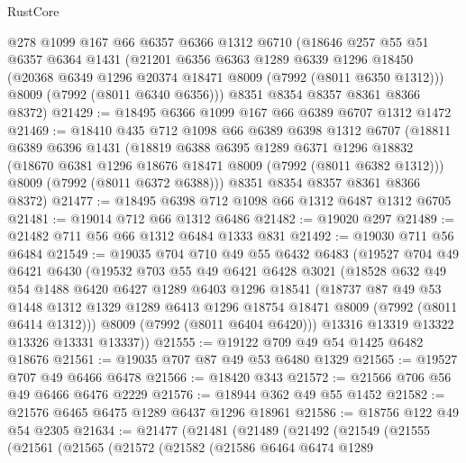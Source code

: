 \begin{lexlean}{RustCore}
\begin{coremodule}
    @278
    @1099
    @167
    @66
    @6357
    @6366
    @1312
    @6710
    (@18646
      @257
      @55
      @51
      @6357
      @6364
      @1431
      (@21201
        @6356
        @6363
        @1289
        @6339
        @1296
        @18450
        (@20368 @6349 @1296 @20374 @18471 @8009 (@7992 (@8011 @6350 @1312)))
        @8009
        (@7992 (@8011 @6340 @6356)))
      @8351
      @8354
      @8357
      @8361
      @8366
      @8372)
@21429 := @18495 @6366 @1099 @167 @66 @6389 @6707 @1312 @1472
@21469 := @18410
    @435
    @712
    @1098
    @66
    @6389
    @6398
    @1312
    @6707
    (@18811
      @6389
      @6396
      @1431
      (@18819
        @6388
        @6395
        @1289
        @6371
        @1296
        @18832
        (@18670 @6381 @1296 @18676 @18471 @8009 (@7992 (@8011 @6382 @1312)))
        @8009
        (@7992 (@8011 @6372 @6388)))
      @8351
      @8354
      @8357
      @8361
      @8366
      @8372)
@21477 := @18495 @6398 @712 @1098 @66 @1312 @6487 @1312 @6705
@21481 := @19014 @712 @66 @1312 @6486
@21482 := @19020 @297
@21489 := @21482 @711 @56 @66 @1312 @6484 @1333 @831
@21492 := @19030 @711 @56 @6484
@21549 := @19035
    @704
    @710
    @49
    @55
    @6432
    @6483
    (@19527
      @704
      @49
      @6421
      @6430
      (@19532
        @703
        @55
        @49
        @6421
        @6428
        @3021
        (@18528
          @632
          @49
          @54
          @1488
          @6420
          @6427
          @1289
          @6403
          @1296
          @18541
          (@18737
            @87
            @49
            @53
            @1448
            @1312
            @1329
            @1289
            @6413
            @1296
            @18754
            @18471
            @8009
            (@7992 (@8011 @6414 @1312)))
          @8009
          (@7992 (@8011 @6404 @6420)))
        @13316
        @13319
        @13322
        @13326
        @13331
        @13337))
@21555 := @19122 @709 @49 @54 @1425 @6482 @18676
@21561 := @19035 @707 @87 @49 @53 @6480 @1329
@21565 := @19527 @707 @49 @6466 @6478
@21566 := @18420 @343
@21572 := @21566 @706 @56 @49 @6466 @6476 @2229
@21576 := @18944 @362 @49 @55 @1452
@21582 := @21576 @6465 @6475 @1289 @6437 @1296 @18961
@21586 := @18756 @122 @49 @54 @2305
@21634 := @21477
    (@21481
      (@21489
        (@21492
          (@21549
            (@21555
              (@21561
                (@21565
                  (@21572
                    (@21582
                      (@21586
                        @6464
                        @6474
                        @1289

\end{coremodule}
\end{lexlean}
